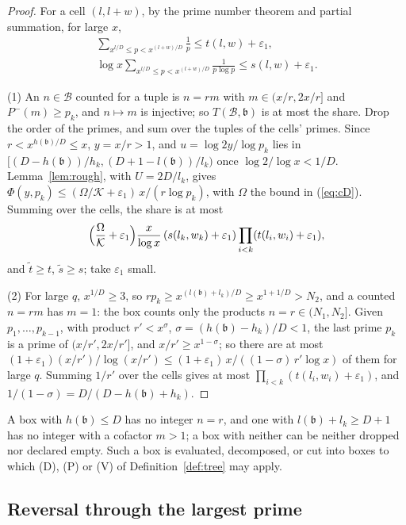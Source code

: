 \documentclass[11pt]{article}
\theoremstyle{definition}
\begin{document}
\begin{proof}
For a cell $(l, l + w)$, by the prime number theorem and partial summation, for large $x$,
\begin{gather*}
  \sum_{x^{l/D} \le p < x^{(l + w)/D}} \frac1p \le t(l, w) + \varepsilon_1, \\
  \log x \sum_{x^{l/D} \le p < x^{(l + w)/D}} \frac1{p \log p} \le s(l, w) + \varepsilon_1.
\end{gather*}

(1) An $n \in \mathcal B$ counted for a tuple is $n = rm$ with $m \in (x/r, 2x/r]$ and $P^-(m) \ge p_k$, and $n \mapsto
m$
is injective; so $T(\mathcal B, \mathfrak b)$ is at most the share. Drop the order of the primes, and sum over the
tuples of the cells' primes. Since $r < x^{h(\mathfrak b)/D} \le x$, $y = x/r > 1$, and $u = \log 2y/\log p_k$ lies in
$[(D - h(\mathfrak b))/h_k, (D + 1 - l(\mathfrak b))/l_k)$ once $\log 2/\log x < 1/D$. Lemma~\ref{lem:rough}, with
$U = 2D/l_k$, gives $\Phi(y, p_k) \le (\Omega/\mathcal K + \varepsilon_1)\, x/(r \log p_k)$, with $\Omega$ the bound in
(\ref{eq:cD}). Summing over the cells, the share is at most
\[
  \Bigl(\frac\Omega{\mathcal K} + \varepsilon_1\Bigr) \frac{x}{\log x}\, (s(l_k, w_k) + \varepsilon_1) \prod_{i < k}
  (t(l_i, w_i) + \varepsilon_1),
\]
and $\tilde t \ge t$, $\tilde s \ge s$; take $\varepsilon_1$ small.

(2) For large $q$, $x^{1/D} \ge 3$, so $rp_k \ge x^{(l(\mathfrak b) + l_k)/D} \ge x^{1 + 1/D} > N_2$, and a counted $n =
rm$ has $m = 1$: the box counts only the products $n = r \in (N_1, N_2]$. Given $p_1, \dots, p_{k-1}$, with product $r'
< x^\sigma$, $\sigma = (h(\mathfrak b) - h_k)/D < 1$, the last prime $p_k$ is a prime of $(x/r', 2x/r']$, and $x/r' \ge
x^{1 - \sigma}$; so there are at most $(1 + \varepsilon_1)(x/r')/\log(x/r') \le (1 + \varepsilon_1)\, x/((1 -
\sigma)\, r' \log x)$ of them for large $q$. Summing $1/r'$ over the cells gives at most $\prod_{i < k} (t(l_i, w_i) +
\varepsilon_1)$, and $1/(1 - \sigma) = D/(D - h(\mathfrak b) + h_k)$.
\end{proof}

A box with $h(\mathfrak b) \le D$ has no integer $n = r$, and one with $l(\mathfrak b) + l_k \ge D + 1$ has no integer
with a cofactor $m > 1$; a box with neither can be neither dropped nor declared empty. Such a box is evaluated,
decomposed, or cut into boxes to which (D), (P) or (V) of Definition~\ref{def:tree} may apply.

\subsection{Reversal through the largest prime}\label{sec:reversal}
\end{document}
